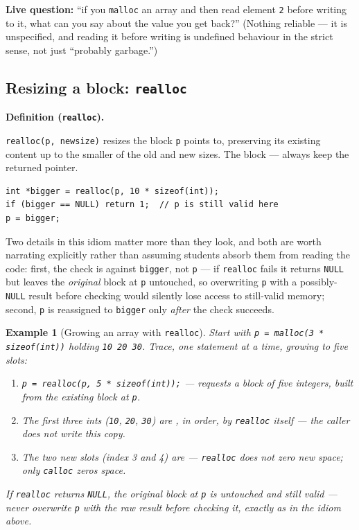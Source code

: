 \documentclass[11pt]{article}
\newtheorem{example}{Example}[section]
\newenvironment{definitionbox}[1]{%
  \par\noindent\textbf{Definition (#1).}\ \itshape
}{\par\vspace{0.3em}}
\begin{document}
\textbf{Live question:} ``if you \texttt{malloc} an array and then read element \texttt{2} before writing to it, what can you say about the value you get back?'' (Nothing reliable --- it is unspecified, and reading it before writing is undefined behaviour in the strict sense, not just ``probably garbage.'')

\subsection{Resizing a block: \texttt{realloc}}
\label{sec:realloc}

\begin{definitionbox}{\texttt{realloc}}
\texttt{realloc(p, newsize)} resizes the block \texttt{p} points to, preserving its existing content up to the smaller of the old and new sizes. The block  --- always keep the returned pointer.
\end{definitionbox}
\begin{verbatim}
int *bigger = realloc(p, 10 * sizeof(int));
if (bigger == NULL) return 1;  // p is still valid here
p = bigger;
\end{verbatim}
Two details in this idiom matter more than they look, and both are worth narrating explicitly rather than assuming students absorb them from reading the code: first, the check is against \texttt{bigger}, not \texttt{p} --- if \texttt{realloc} fails it returns \texttt{NULL} but leaves the \emph{original} block at \texttt{p} untouched, so overwriting \texttt{p} with a possibly-\texttt{NULL} result before checking would silently lose access to still-valid memory; second, \texttt{p} is reassigned to \texttt{bigger} only \emph{after} the check succeeds.

\begin{example}[Growing an array with \texttt{realloc}]
Start with \texttt{p = malloc(3 * sizeof(int))} holding \texttt{10 20 30}. Trace, one statement at a time, growing to five slots:
\begin{enumerate}
  \item \texttt{p = realloc(p, 5 * sizeof(int));} --- requests a block of five integers, built from the existing block at \texttt{p}.
  \item The first three ints (\texttt{10}, \texttt{20}, \texttt{30}) are , in order, by \texttt{realloc} itself --- the caller does not write this copy.
  \item The two new slots (index 3 and 4) are  --- \texttt{realloc} does not zero new space; only \texttt{calloc} zeros space.
\end{enumerate}
If \texttt{realloc} returns \texttt{NULL}, the original block at \texttt{p} is untouched and still valid --- never overwrite \texttt{p} with the raw result before checking it, exactly as in the idiom above.
\end{example}
\end{document}
